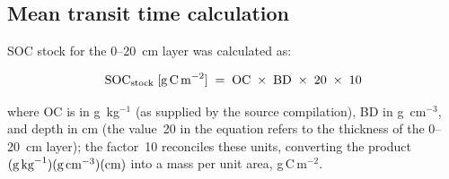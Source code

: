 \documentclass[12pt, a4paper]{article}
\begin{document}
\subsection{Mean transit time calculation}
\label{sec:mtt_calc}

SOC stock for the 0--20~cm layer was calculated as:

\begin{equation}
  \text{SOC}_\text{stock}\;[\text{g\,C\,m}^{-2}]
  \;=\; \text{OC} \;\times\; \text{BD} \;\times\; 20 \;\times\; 10
  \label{eq:soc_stock}
\end{equation}

\noindent
where OC is in g~kg$^{-1}$ (as supplied by the source compilation), BD in
g~cm$^{-3}$, and depth in cm (the value~20 in the equation refers to the thickness of the
0--20~cm layer); the factor~10 reconciles these units,
converting the product $(\text{g\,kg}^{-1})(\text{g\,cm}^{-3})(\text{cm})$
into a mass per unit area, g\,C\,m$^{-2}$.
\end{document}
